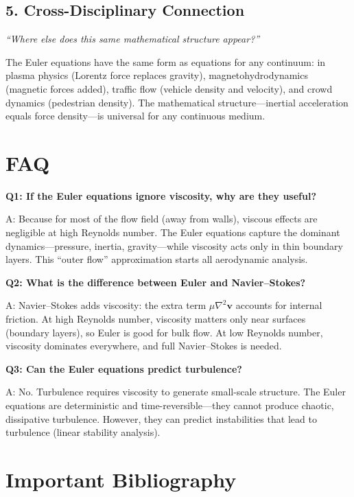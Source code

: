 \documentclass[11pt,openright]{book}
\begin{document}
\subsection*{5. Cross-Disciplinary Connection}
\textit{``Where else does this same mathematical structure appear?''}

The Euler equations have the same form as equations for any continuum: in plasma physics (Lorentz force replaces gravity), magnetohydrodynamics (magnetic forces added), traffic flow (vehicle density and velocity), and crowd dynamics (pedestrian density). The mathematical structure---inertial acceleration equals force density---is universal for any continuous medium.


\section*{FAQ}

\textbf{Q1: If the Euler equations ignore viscosity, why are they useful?}

A: Because for most of the flow field (away from walls), viscous effects are negligible at high Reynolds number. The Euler equations capture the dominant dynamics---pressure, inertia, gravity---while viscosity acts only in thin boundary layers. This ``outer flow'' approximation starts all aerodynamic analysis.

\textbf{Q2: What is the difference between Euler and Navier--Stokes?}

A: Navier--Stokes adds viscosity: the extra term $\mu \nabla^2 \mathbf{v}$ accounts for internal friction. At high Reynolds number, viscosity matters only near surfaces (boundary layers), so Euler is good for bulk flow. At low Reynolds number, viscosity dominates everywhere, and full Navier--Stokes is needed.

\textbf{Q3: Can the Euler equations predict turbulence?}

A: No. Turbulence requires viscosity to generate small-scale structure. The Euler equations are deterministic and time-reversible---they cannot produce chaotic, dissipative turbulence. However, they can predict instabilities that lead to turbulence (linear stability analysis).
\section*{Important Bibliography}
\end{document}
